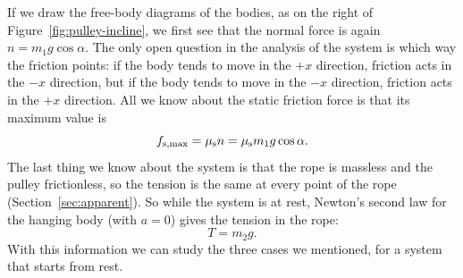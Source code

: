 \documentclass[11pt,a4paper]{article}
\begin{document}
If we draw the free-body diagrams of the bodies, as on the right of Figure~\ref{fig:pulley-incline},
we first see that the normal force is again $n = m_1 g\cos\alpha$. The only open question in the
analysis of the system is which way the friction points: if the body tends to move in the $+x$
direction, friction acts in the $-x$ direction, but if the body tends to move in the $-x$ direction,
friction acts in the $+x$ direction. All we know about the static friction force is that its maximum
value is
\begin{equation}\label{eq:pi-fmax}
  f_{\mathrm{s,max}} = \mu_{\mathrm{s}} n = \mu_{\mathrm{s}} m_1 g \cos\alpha .
\end{equation}
The last thing we know about the system is that the rope is massless and the pulley frictionless, so
the tension is the same at every point of the rope (Section~\ref{sec:apparent}). So while the system is
at rest, Newton's second law for the hanging body (with $a = 0$) gives the tension in the rope:
\begin{equation}\label{eq:pi-T}
  T = m_2 g .
\end{equation}
With this information we can study the three cases we mentioned, for a system that starts from rest.
\end{document}
